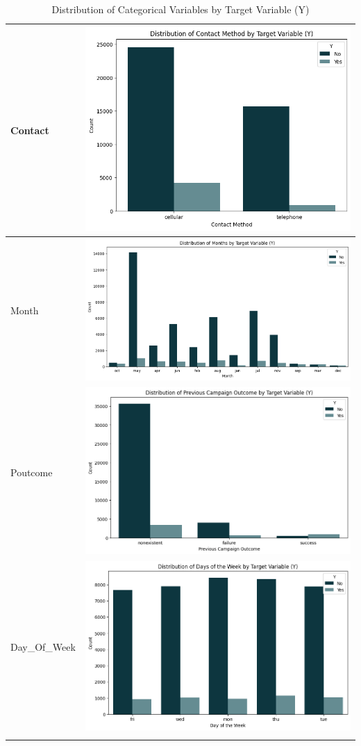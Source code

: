 \documentclass{article}
\begin{document}
\begin{longtable}{|l|c|}
               Contact & \includegraphics[width=0.7\linewidth]{data/bank_marketing/pic/Bank_Add_Contact.png} \\ \hline
               Month & \includegraphics[width=0.7\linewidth]{data/bank_marketing/pic/Bank_Add_Month.png} \\ \hline
               Poutcome & \includegraphics[width=0.7\linewidth]{data/bank_marketing/pic/Bank_Add_Pout.png} \\ \hline
               Day\_Of\_Week & \includegraphics[width=0.7\linewidth]{data/bank_marketing/pic/Bank_Add_Dayweek.png} \\ 
               \hline
               \caption{Distribution of Categorical Variables by Target Variable (Y)}
               \label{tab:attribute_distribution}
           \end{longtable}  
\end{document}

